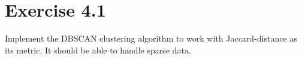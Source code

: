 \documentclass{article}
\begin{document}




\section{Exercise 4.1}
Implement the DBSCAN clustering algorithm to work with Jaccard-distance as its metric. It should be able to handle sparse data.
%
%
\end{document}

